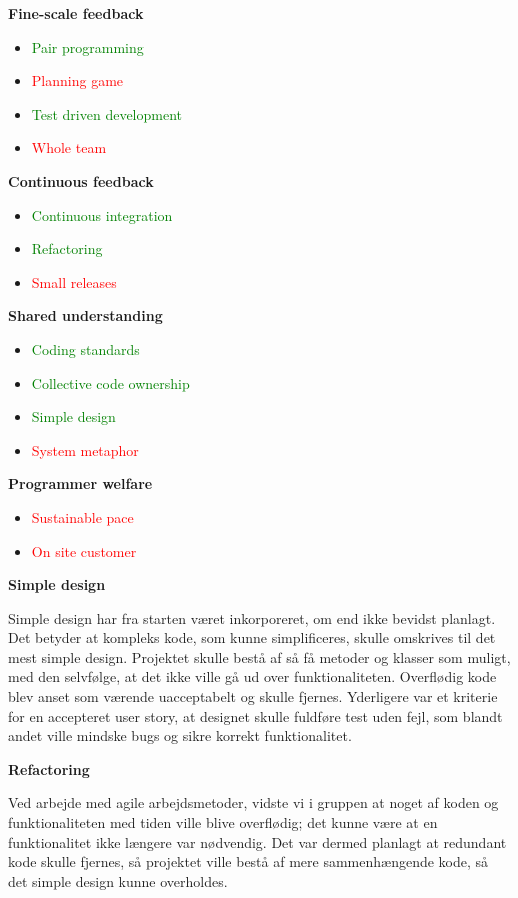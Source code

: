 \documentclass[11pt]{report}
\begin{document}
\noindent\textbf{Fine-scale feedback}
\begin{itemize}
  \item \textcolor{green}{Pair programming}
  \item \textcolor{red}{Planning game}
  \item \textcolor{green}{Test driven development}
  \item \textcolor{red}{Whole team}
\end{itemize}
\textbf{Continuous feedback}
\begin{itemize}
  \item \textcolor{green}{Continuous integration}
  \item \textcolor{green}{Refactoring}
  \item \textcolor{red}{Small releases}
\end{itemize}
\newpage
\noindent\textbf{Shared understanding}
\begin{itemize}
  \item \textcolor{green}{Coding standards}
  \item \textcolor{green}{Collective code ownership}
  \item \textcolor{green}{Simple design}
  \item \textcolor{red}{System metaphor}
\end{itemize}
\textbf{Programmer welfare}
\begin{itemize}
  \item \textcolor{red}{Sustainable pace}
  \item \textcolor{red}{On site customer}
\end{itemize}

\noindent\textbf{Simple design}

Simple design har fra starten været inkorporeret, om end ikke bevidst planlagt. Det betyder at kompleks kode, som kunne simplificeres, skulle omskrives til det mest simple design. Projektet skulle bestå af så få metoder og klasser som muligt, med den selvfølge, at det ikke ville gå ud over funktionaliteten. Overflødig kode blev anset som værende uacceptabelt og skulle fjernes. Yderligere var et kriterie for en accepteret user story, at designet skulle fuldføre test uden fejl, som blandt andet ville mindske bugs og sikre korrekt funktionalitet.

\noindent\textbf{Refactoring}

Ved arbejde med agile arbejdsmetoder, vidste vi i gruppen at noget af koden og funktionaliteten med tiden ville blive overflødig; det kunne være at en funktionalitet ikke længere var nødvendig. Det var dermed planlagt at redundant kode skulle fjernes, så projektet ville bestå af mere sammenhængende kode, så det simple design kunne overholdes.
\end{document}
